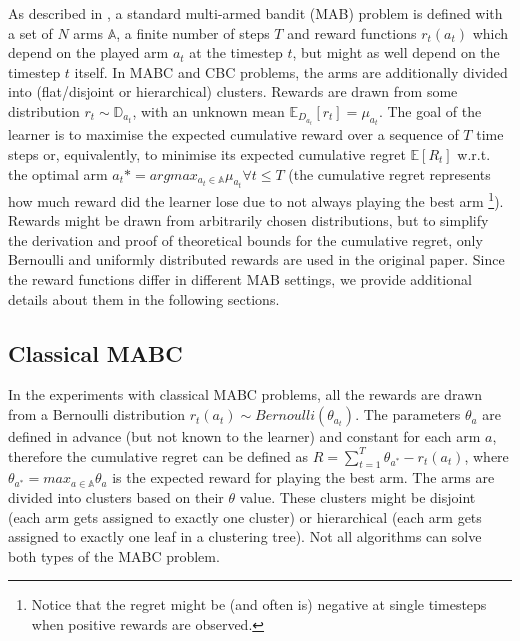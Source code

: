 As described in \cite{bandits}, a standard multi-armed bandit (MAB) problem is defined with a set of $N$ arms $\mathbb{A}$, a finite number of steps $T$ and reward functions $r_t(a_t)$ which depend on the played arm $a_t$ at the timestep $t$, but might as well depend on the timestep $t$ itself. In MABC and CBC problems, the arms are additionally divided into (flat/disjoint or hierarchical) clusters. Rewards are drawn from some distribution $r_t \sim \mathbb{D}_{a_t}$, with an unknown mean $\mathbb{E}_{D_{a_t}}[r_t] = \mu_{a_t}$. The goal of the learner is to maximise the expected cumulative reward over a sequence of $T$ time steps or, equivalently, to minimise its expected cumulative regret $\mathbb{E}[R_t]$ w.r.t. the optimal arm $a_t* = arg max_{a_t \in \mathbb{A}} \mu_{a_t} \forall t \leq T$ (the cumulative regret represents how much reward did the learner lose due to not always playing the best arm \footnote{Notice that the regret might be (and often is) negative at single timesteps when positive rewards are observed.}). Rewards might be drawn from arbitrarily chosen distributions, but to simplify the derivation and proof of theoretical bounds for the cumulative regret, only Bernoulli and uniformly distributed rewards are used in the original paper. Since the reward functions differ in different MAB settings, we provide additional details about them in the following sections. 

\subsection{Classical MABC}

In the experiments with classical MABC problems, all the rewards are drawn from a Bernoulli distribution $r_t(a_t) \sim Bernoulli(\theta_{a_t})$. The parameters $\theta_a$ are defined in advance (but not known to the learner) and constant for each arm $a$, therefore the cumulative regret can be defined as $R = \sum_{t=1}^{T} \theta_{a^*} - r_t(a_t)$, where $\theta_{a^*} = max_{a \in \mathbb{A}} \theta_a$ is the expected reward for playing the best arm. The arms are divided into clusters based on their $\theta$ value. These clusters might be disjoint (each arm gets assigned to exactly one cluster) or hierarchical (each arm gets assigned to exactly one leaf in a clustering tree). Not all algorithms can solve both types of the MABC problem.


